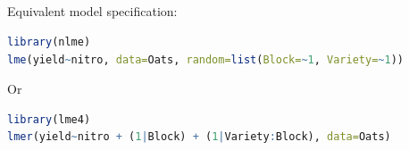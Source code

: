 \documentclass[a4paper,12pt]{article}
\begin{document}
	\subsection{}
		Equivalent model specification:\\
		\begin{lstlisting}[language=R]
library(nlme)
lme(yield~nitro, data=Oats, random=list(Block=~1, Variety=~1))
		\end{lstlisting}
		Or
		\begin{lstlisting}[language=R]
library(lme4)
lmer(yield~nitro + (1|Block) + (1|Variety:Block), data=Oats)
		\end{lstlisting}
%		
%	
		
\end{document}
